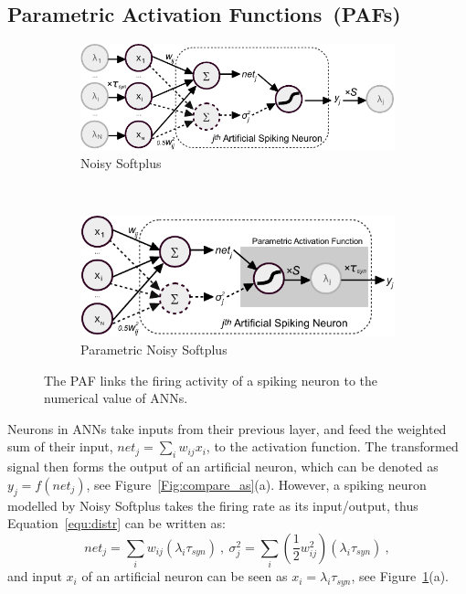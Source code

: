 \documentclass{article}
\begin{document}
	\subsection{Parametric Activation Functions~(PAFs)}
	\begin{figure}[tbh!]
		\centering
		\begin{subfigure}[t]{0.49\textwidth}
			\includegraphics[width=\textwidth]{pics_iconip/neuron_o.pdf}
			\caption{Noisy Softplus}
		\end{subfigure}~~~
		\begin{subfigure}[t]{0.42\textwidth}
			\includegraphics[width=\textwidth]{pics_iconip/neuron_PAF.pdf}
			\caption{Parametric Noisy Softplus}
		\end{subfigure}
		\caption{The PAF links the firing activity of a spiking neuron to the numerical value of ANNs.}
		\label{Fig:tneuron}
	\end{figure}
	
	
	Neurons in ANNs take inputs from their previous layer, and feed the weighted sum of their input, $net_j = \sum_i w_{ij}x_i$, to the activation function.
	The transformed signal then forms the output of an artificial neuron, which can be denoted as $y_j=f(net_j)$, see Figure~\ref{Fig:compare_as}(a).
	However, a spiking neuron modelled by Noisy Softplus takes the firing rate as its input/output, thus Equation~\ref{equ:distr} can be written as:
	\begin{equation}
	net_j = \sum_i w_{ij}(\lambda_{i}\tau_{syn})~,
	~\sigma^2_j= \sum_i (\frac{1}{2} w_{ij}^2)(\lambda_{i}\tau_{syn})~, 
	\label{equ:mi_input}
	\end{equation}
	and input $ x_i $ of an artificial neuron can be seen as $x_i=\lambda_{i}\tau_{syn}$, see Figure~\ref{Fig:tneuron}(a).
	
\end{document}
